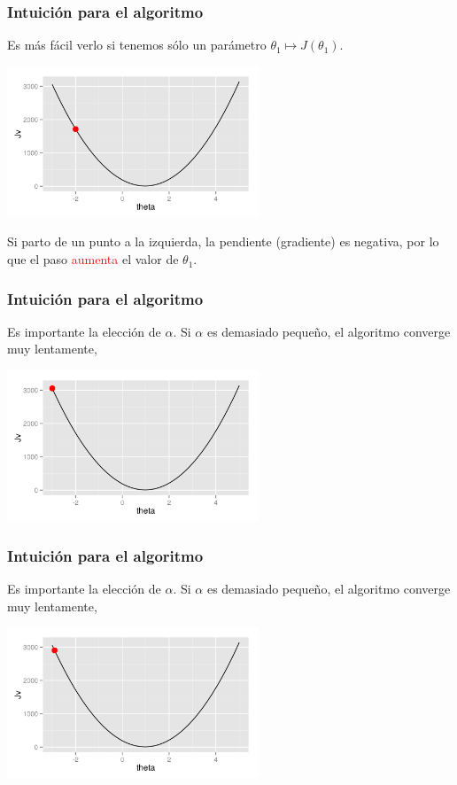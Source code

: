 \documentclass[aspectratio=169]{beamer}
\begin{document}
\begin{frame}
 \frametitle{Intuición para el algoritmo}
 \begin{overlayarea}{\textwidth}{8cm}
 Es más fácil verlo si tenemos sólo un parámetro $\theta_1\mapsto J(\theta_1)$.
\begin{center}
  \includegraphics[height=4.5cm]{gradientdescent-izquierda-2.png}
\end{center}
Si parto de un punto a la izquierda, la pendiente (gradiente) es negativa, por lo que el paso \textcolor{red}{aumenta} el valor de $\theta_1$.   
 \end{overlayarea}
\end{frame}


\begin{frame}
 \frametitle{Intuición para el algoritmo}
 \begin{overlayarea}{\textwidth}{8cm}
Es importante la elección de $\alpha$. Si $\alpha$ es demasiado pequeño, el algoritmo converge muy lentamente,
\begin{center}
  \includegraphics[height=4.5cm]{gradientdescent-smallalpha-1.png}
\end{center}
 \end{overlayarea}
\end{frame}

\begin{frame}
 \frametitle{Intuición para el algoritmo}
 \begin{overlayarea}{\textwidth}{8cm}
Es importante la elección de $\alpha$. Si $\alpha$ es demasiado pequeño, el algoritmo converge muy lentamente,
\begin{center}
  \includegraphics[height=4.5cm]{gradientdescent-smallalpha-2.png}
\end{center}
 \end{overlayarea}
\end{frame}
\end{document}
